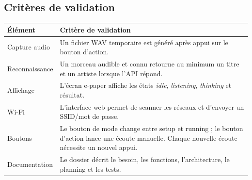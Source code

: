 \subsection{Critères de validation}

\begin{longtable}{|p{4cm}|p{9cm}|}
\hline
\textbf{Élément} & \textbf{Critère de validation} \\
\hline
Capture audio & Un fichier WAV temporaire est généré après appui sur le bouton d'action. \\
\hline
Reconnaissance & Un morceau audible et connu retourne au minimum un titre et un artiste lorsque l'API répond. \\
\hline
Affichage & L'écran e-paper affiche les états \textit{idle}, \textit{listening}, \textit{thinking} et résultat. \\
\hline
Wi-Fi & L'interface web permet de scanner les réseaux et d'envoyer un SSID/mot de passe. \\
\hline
Boutons & Le bouton de mode change entre setup et running ; le bouton d'action lance une écoute manuelle. Chaque nouvelle écoute nécessite un nouvel appui. \\
\hline
Documentation & Le dossier décrit le besoin, les fonctions, l'architecture, le planning et les tests. \\
\hline
\end{longtable}
